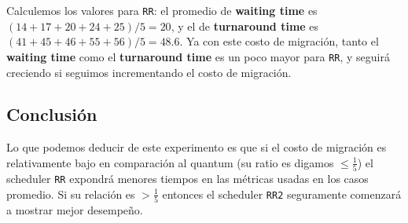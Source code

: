 \FloatBarrier
Calculemos los valores para \texttt{RR}: el promedio de \textbf{waiting time} es $(14 + 17 + 20 + 24 + 25) / 5 = 20$, y el de \textbf{turnaround time} es $(41 + 45 + 46 + 55 + 56) / 5 = 48.6$.
Ya con este costo de migración, tanto el \textbf{waiting time} como el \textbf{turnaround time} es un poco mayor para \texttt{RR}, y seguirá creciendo si seguimos incrementando el costo de migración.

\subsection{Conclusión}

Lo que podemos deducir de este experimento es que si el costo de migración es relativamente bajo en comparación al quantum (su ratio es digamos $\leq \frac{1}{5}$) el scheduler \texttt{RR} expondrá menores tiempos en las métricas usadas en los casos promedio. Si su relación es $> \frac{1}{5}$ entonces el scheduler \texttt{RR2} seguramente comenzará a mostrar mejor desempeño.


